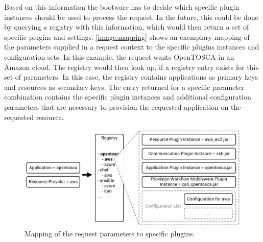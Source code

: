 Based on this information the bootware has to decide which specific plugin instances should be used to process the request.
In the future, this could be done by querying a registry with this information, which would then return a set of specific plugins and settings.
\autoref{image:mapping} shows an exemplary mapping of the parameters supplied in a request context to the specific plugins instances and configuration sets.
In this example, the request wants OpenTOSCA in an Amazon cloud.
The registry would then look up, if a registry entry exists for this set of parameters.
In this case, the registry contains applications as primary keys and resources as secondary keys.
The entry returned for a specific parameter combination contains the specific plugin instances and additional configuration parameters that are necessary to provision the requested application on the requested resource.

\begin{figure}[!htbp]
	\centering
	\includegraphics[resolution=600]{design/assets/mapping}
	\caption{Mapping of the request parameters to specific plugins.}
	\label{image:mapping}
\end{figure}


